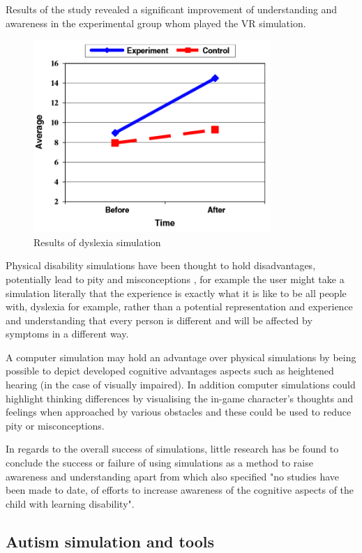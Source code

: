 \documentclass[11pt]{report}
\begin{document}
Results of the study revealed a significant improvement of understanding and awareness in the experimental group whom played the VR simulation.

\begin{figure}[H]
\centering
\includegraphics[width=90mm]{images/litreview/dsimresults.png}
\caption{Results of dyslexia simulation}
\label{autisim1}
\end{figure}

Physical disability simulations have been thought to hold disadvantages, potentially lead to pity and misconceptions \cite{dd}, for example the user might take a simulation literally that the experience is exactly what it is like to be all people with, dyslexia for example, rather than a potential representation and experience and understanding that every person is different and will be affected by symptoms in a different way.

A computer simulation may hold an advantage over physical simulations by being possible to depict developed cognitive advantages aspects such as heightened hearing (in the case of visually impaired). In addition computer simulations could highlight thinking differences by visualising the in-game character's thoughts and feelings when approached by various obstacles and these could be used to reduce pity or misconceptions.

In regards to the overall success of simulations, little research has be found to conclude the success or failure of using simulations as a method to raise awareness and understanding apart from \cite{dyslexicsimpar} which also specified "no studies have been made to date, of efforts to increase awareness of the cognitive aspects of the child with learning disability".

\subsection{Autism simulation and tools}
\end{document}
